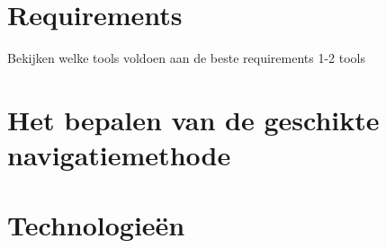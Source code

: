 \section{Requirements}
\label{sec:requirements}
Bekijken welke tools voldoen aan de beste requirements 1-2 tools
\section{Het bepalen van de geschikte navigatiemethode}
\label{sec:het bepalen van de geschikte navigatiemethode}
\section{Technologieën}
\label{sec:technologieën}

